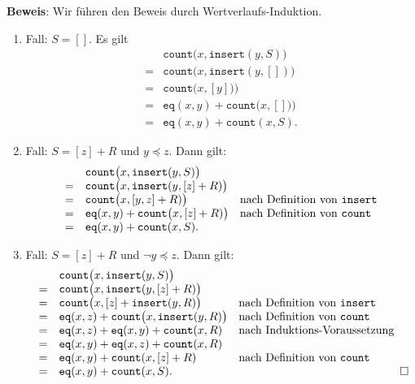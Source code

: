 \noindent
\textbf{Beweis}: Wir f\"uhren den Beweis durch Wertverlaufs-Induktion.
\begin{enumerate}
\item Fall: $S = []$. Es gilt
      $$
      \begin{array}{cll}
        & \mathtt{count}\bigl(x, \mathtt{insert}(y, S) \bigr) \\
      = & \mathtt{count}\bigl(x, \mathtt{insert}(y, []) \bigr) \\
      = & \mathtt{count}\bigl(x, [y]) \bigr) \\
      = & \mathtt{eq}(x,y) + \mathtt{count}\bigl(x, []) \bigr) \\
      = & \mathtt{eq}(x,y) + \mathtt{count}(x,S).
      \end{array}
      $$
\item Fall: $S = [z] + R$ und $y \preceq z$. Dann gilt:
        $$
      \begin{array}{cll}
        & \mathtt{count}\bigl(x, \mathtt{insert}(y, S) \bigr) \\
      = & \mathtt{count}\bigl(x, \mathtt{insert}(y, [z] + R) \bigr) \\
      = & \mathtt{count}\bigl(x, [y,z] + R) \bigr) & \mbox{nach Definition von \texttt{insert}}\\
      = & \mathtt{eq}(x,y) + \mathtt{count}\bigl(x, [z] + R) \bigr) &
          \mbox{nach Definition von \texttt{count}} \\
      = & \mathtt{eq}(x,y) + \mathtt{count}(x,S).
      \end{array}
      $$
\item Fall: $S = [z] + R$ und $\neg y \preceq z$.  Dann gilt:
      $$
      \begin{array}[b]{cll}
        & \mathtt{count}\bigl(x, \mathtt{insert}(y, S) \bigr) \\
      = & \mathtt{count}\bigl(x, \mathtt{insert}(y, [z] + R) \bigr) \\
      = & \mathtt{count}\bigl(x, [z] + \mathtt{insert}(y,R) \bigr) & \mbox{nach Definition von \texttt{insert}}\\
      = & \mathtt{eq}(x,z) + \mathtt{count}\bigl(x, \mathtt{insert}(y, R) \bigr) &
          \mbox{nach Definition von \texttt{count}} \\
      = & \mathtt{eq}(x,z) + \mathtt{eq}(x,y) + \mathtt{count}(x, R) &
          \mbox{nach Induktions-Voraussetzung} \\
      = & \mathtt{eq}(x,y) + \mathtt{eq}(x,z) + \mathtt{count}(x, R)
          \\
      = & \mathtt{eq}(x,y) + \mathtt{count}(x, [z] + R) &
          \mbox{nach Definition von \texttt{count}} \\

      = & \mathtt{eq}(x,y) + \mathtt{count}(x,S).
      \end{array}\hspace*{\fill} \Box
      $$
\end{enumerate}


